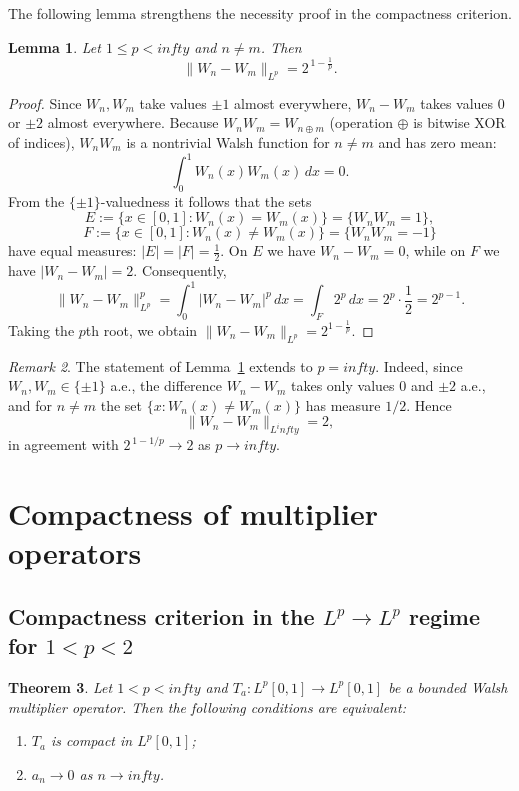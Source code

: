 \documentclass[a4paper,12pt]{article}
\newtheorem{theorem}{Theorem}[section]
\newtheorem{lemma}[theorem]{Lemma}
\theoremstyle{definition}
\theoremstyle{remark}
\newtheorem{remark}[theorem]{Remark}
\theoremstyle{definition}
\newcommand{\Lp}{L^p[0,1]}
\def\infty{infty}%
\begin{document}
The following lemma strengthens the necessity proof in the compactness criterion.

\begin{lemma}
\label{lem:WalshDistance}
Let $1\le p<\infty$ and $n\neq m$.
Then
\[
\|W_n-W_m\|_{L^p} = 2^{\,1-\frac1p}.
\]
\end{lemma}

\begin{proof}
Since $W_n,W_m$ take values $\pm 1$ almost everywhere,
$W_n-W_m$ takes values $0$ or $\pm 2$ almost everywhere.
Because $W_nW_m = W_{n\oplus m}$ (operation $\oplus$ is bitwise XOR of indices),
$W_nW_m$ is a nontrivial Walsh function for $n\neq m$ and has zero mean:
\[
\int_0^1 W_n(x)W_m(x)\,dx = 0.
\]
From the $\{\pm1\}$-valuedness it follows that the sets
\[
E:=\{x\in[0,1]: W_n(x)=W_m(x)\}=\{W_nW_m=1\},
\]
\[
F:=\{x\in[0,1]: W_n(x)\neq W_m(x)\}=\{W_nW_m=-1\}
\]
have equal measures: $|E|=|F|=\tfrac12$.
On $E$ we have $W_n-W_m=0$, while on $F$ we have $|W_n-W_m|=2$.
Consequently,
\[
\|W_n-W_m\|_{L^p}^p
=
\int_0^1 |W_n-W_m|^p\,dx
=
\int_F 2^p\,dx
=
2^p\cdot \frac12
=
2^{p-1}.
\]
Taking the $p$th root, we obtain
$\|W_n-W_m\|_{L^p}=2^{1-\frac1p}$.
\end{proof}
\begin{remark}
The statement of Lemma~\ref{lem:WalshDistance}
extends to $p=\infty$. Indeed, since $W_n,W_m\in\{\pm1\}$ a.e.,
the difference $W_n-W_m$ takes only values $0$ and $\pm2$ a.e., and for $n\ne m$
the set $\{x: W_n(x)\ne W_m(x)\}$ has measure $1/2$. Hence
\[
\|W_n-W_m\|_{L^\infty}=2,
\]
in agreement with $2^{\,1-1/p}\to2$ as $p\to\infty$.
\end{remark}



\section{Compactness of multiplier operators}
\label{sec:compact}

\subsection{Compactness criterion in the $L^p\to L^p$ regime for $1<p<2$}

\begin{theorem}
\label{thm:compactLp}
Let $1<p<\infty$ and $T_a:\Lp\to\Lp$ be a bounded Walsh multiplier operator.
Then the following conditions are equivalent:
\begin{enumerate}
\item[(i)] $T_a$ is compact in $\Lp$;
\item[(ii)] $a_n\to 0$ as $n\to\infty$.
\end{enumerate}
\end{theorem}
\end{document}
